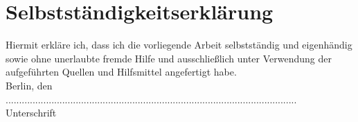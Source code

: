 \section*{Selbstständigkeitserklärung}
\vspace{5cm}
\begin{framed}
Hiermit erkläre ich, dass ich die vorliegende Arbeit selbstständig und eigenhändig sowie ohne unerlaubte
fremde Hilfe und ausschließlich unter Verwendung der aufgeführten Quellen und Hilfsmittel angefertigt habe.\\

Berlin, den\\

............................................................................................................\\
Unterschrift
\end{framed}
\newpage

